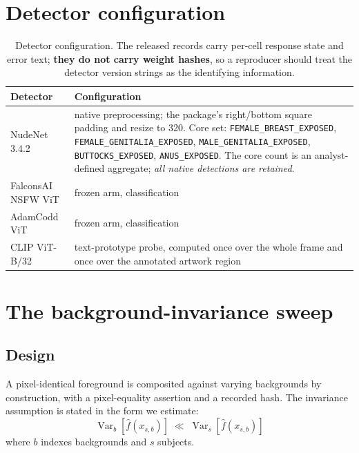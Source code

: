 \section{Detector configuration}
\label{app:detectors}

\begin{table}[H]
\centering\small
\begin{tabularx}{\linewidth}{@{}lX@{}}
\toprule
Detector & Configuration \\
\midrule
NudeNet 3.4.2 & native preprocessing; the package's right/bottom square padding and resize to 320. Core set: \texttt{FEMALE\_BREAST\_EXPOSED}, \texttt{FEMALE\_GENITALIA\_EXPOSED}, \texttt{MALE\_GENITALIA\_EXPOSED}, \texttt{BUTTOCKS\_EXPOSED}, \texttt{ANUS\_EXPOSED}. The core count is an analyst-defined aggregate; \emph{all native detections are retained}. \\
FalconsAI NSFW ViT & frozen arm, classification \\
AdamCodd ViT & frozen arm, classification \\
CLIP ViT-B/32 & text-prototype probe, computed once over the whole frame and once over the annotated artwork region \\
\bottomrule
\end{tabularx}
\caption{Detector configuration. The released records carry per-cell response
state and error text; \textbf{they do not carry weight hashes}, so a reproducer
should treat the detector version strings as the identifying information.}
\label{tab:detcfg}
\end{table}

\section{The background-invariance sweep}
\label{app:sweep}

\subsection{Design}

A pixel-identical foreground is composited against varying backgrounds by
construction, with a pixel-equality assertion and a recorded hash. The
invariance assumption is stated in the form we estimate:
\begin{equation}
\operatorname{Var}_{b}\!\left[\hat f(x_{s,b})\right]
\;\ll\;
\operatorname{Var}_{s}\!\left[\hat f(x_{s,b})\right]
\end{equation}
where $b$ indexes backgrounds and $s$ subjects.

